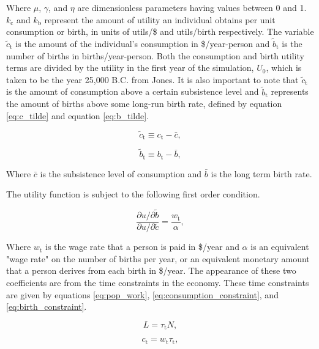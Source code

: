 \documentclass[letterpaper,12pt]{article}
\begin{document}
Where $\mu$, $\gamma$, and $\eta$ are dimensionless parameters having values between 0 and 1. $k_\mathrm{c}$ and $k_\mathrm{b}$ represent the amount of utility an individual obtains per unit consumption or birth, in units of utils/\$ and utils/birth respectively. The variable $\tilde c_\mathrm{t}$ is the amount of the individual's consumption in \$/year-person and $\tilde b_\mathrm{t}$ is the number of births in births/year-person. Both the consumption and birth utility terms are divided by the utility in the first year of the simulation, $U_\mathrm{0}$, which is taken to be the year 25,000 B.C. from Jones. It is also important to note that $\tilde c_\mathrm{t}$ is the amount of consumption above a certain subsistence level and $\tilde b_\mathrm{t}$ represents the amount of births above some long-run birth rate, defined by equation \ref{eq:c_tilde} and equation \ref{eq:b_tilde}.

\begin{equation} \label{eq:c_tilde}
\tilde c_\mathrm{t} \equiv c_\mathrm{t} - \bar c,
\end{equation}

\begin{equation} \label{eq:b_tilde}
\tilde b_\mathrm{t} \equiv b_\mathrm{t} - \bar b,
\end{equation}

Where $\bar c$ is the subsistence level of consumption and $\bar b$ is the long term birth rate.

The utility function is subject to the following first order condition.

\begin{equation} \label{eq:first_order_condition}
\frac{\partial u/ \partial\tilde b}{\partial u/ \partial\tilde c} = \frac{w_\mathrm{t}}{\alpha},
\end{equation}

Where $w_\mathrm{t}$ is the wage rate that a person is paid in \$/year and $\alpha$ is an equivalent "wage rate" on the number of births per year, or an equivalent monetary amount that a person derives from each birth in \$/year. The appearance of these two coefficients are from the time constraints in the economy. These time constraints are given by equations \ref{eq:pop_work}, \ref{eq:consumption_constraint}, and \ref{eq:birth_constraint}.

\begin{equation}\label{eq:pop_work}
L = \tau_\mathrm{t} N,
\end{equation}

\begin{equation} \label{eq:consumption_constraint}
c_\mathrm{t} = w_\mathrm{t} \tau_\mathrm{t},
\end{equation}
\end{document}
